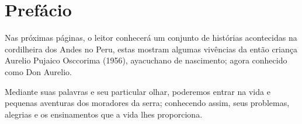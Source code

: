\cleardoublepage
\newpage
\thispagestyle{empty}
\vfill


\chapter*{Prefácio} %

Nas próximas páginas, o leitor conhecerá um conjunto de histórias acontecidas na cordilheira dos Andes no Peru, estas mostram algumas vivências da então criança Aurelio Pujaico Osccorima (1956), %
ayacuchano de nascimento;
agora conhecido como Don Aurelio.

Mediante suas palavras e seu particular olhar, poderemos entrar na vida e pequenas aventuras dos moradores da serra; conhecendo assim, seus problemas, alegrias e os ensinamentos que a vida lhes proporciona. 
\vfill

\newpage
\thispagestyle{empty}
